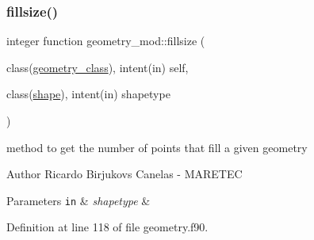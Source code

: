 \subsubsection{\texorpdfstring{fillsize()}{fillsize()}}
{\footnotesize\ttfamily integer function geometry\+\_\+mod\+::fillsize (\begin{DoxyParamCaption}\item[{class(\mbox{\hyperlink{structgeometry__mod_1_1geometry__class}{geometry\+\_\+class}}), intent(in)}]{self,  }\item[{class(\mbox{\hyperlink{structgeometry__mod_1_1shape}{shape}}), intent(in)}]{shapetype }\end{DoxyParamCaption})\hspace{0.3cm}{\ttfamily [private]}}



method to get the number of points that fill a given geometry 

\begin{DoxyAuthor}{Author}
Ricardo Birjukovs Canelas -\/ M\+A\+R\+E\+T\+EC
\end{DoxyAuthor}

\begin{DoxyParams}[1]{Parameters}
\mbox{\tt in}  & {\em shapetype} & \\
\hline
\end{DoxyParams}


Definition at line 118 of file geometry.\+f90.


